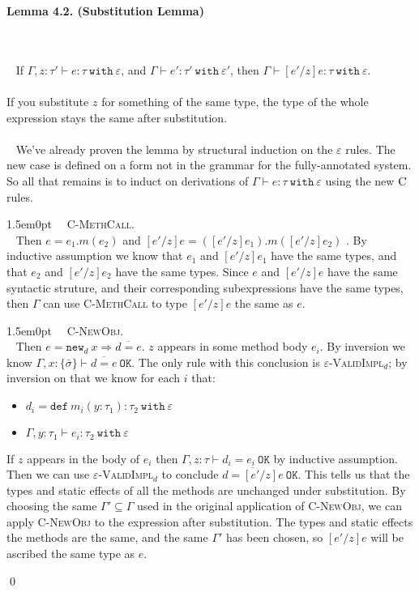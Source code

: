 \documentclass{llncs}
\newcommand{\keywadj}[1]{\mathtt{#1}}
\newcommand{\keyw}[1]{\keywadj{#1}~}
\newcommand{\thm}[3]{
	\begin{large}
		\bf{#1}
	\end{large} \\\\
	\fbox{Statement.} ~ #2
	\fbox{Proof.}~ #3 \qed
}
\newcommand{\proofcase}[2]{
	\begin{adjustwidth}{1.5em}{0pt}
		\fbox{Case.}~~#1. \\ ~#2
	\end{adjustwidth}
}
\newcommand{\type}[2]{
	#1~\keyw{with} #2
}
\newcommand{\newd}[0]{
	\keywadj{new}_d~x \Rightarrow \overline{d = e}
}
\begin{document}
\thm{Lemma 4.2. (Substitution Lemma)}
{If $\Gamma, z : \tau' \vdash e : \tau~\keyw{with} \varepsilon$, and $\Gamma \vdash e' : \tau'~\keyw{with} \varepsilon'$, then $\Gamma \vdash [e'/z]e : \tau~\keyw{with} \varepsilon$. \\\\
\fbox{Intuition} If you substitute $z$ for something of the same type, the type of the whole expression stays the same after substitution.
\\\\}
{We've already proven the lemma by structural induction on the $\varepsilon$ rules. The new case is defined on a form not in the grammar for the fully-annotated system. So all that remains is to induct on derivations of $\Gamma \vdash e : \type{\tau}{\varepsilon}$ using the new $\textsc{C}$ rules.\\

	\proofcase{\textsc{C-MethCall}}{
Then $e = e_1.m(e_2)$ and $[e'/z]e = ([e'/z]e_1).m([e'/z]e_2)$ . By inductive assumption we know that $e_1$ and $[e'/z]e_1$ have the same types, and that $e_2$ and $[e'/z]e_2$ have the same types. Since $e$ and $[e'/z]e$ have the same syntactic struture, and their corresponding subexpressions have the same types, then $\Gamma$ can use \textsc{C-MethCall} to type $[e'/z]e$ the same as $e$.\\
}

	\proofcase{\textsc{C-NewObj}}{
		Then $e = \newd$. $z$ appears in some method body $e_i$. By inversion we know $\Gamma, x : \{ \bar \sigma \} \vdash \overline {d = e}~\keywadj{OK}$. The only rule with this conclusion is \textsc{$\varepsilon$-ValidImpl$_d$}; by inversion on that we know for each $i$ that:
		 \begin{itemize}
		 	\item $d_i = \keyw{def} m_i(y : \tau_1) : \tau_2~\keyw{with} \varepsilon$
		 	\item $\Gamma, y : \tau_1 \vdash e_i : \tau_2~\keyw{with} \varepsilon$
		\end{itemize}

\noindent
If $z$ appears in the body of $e_i$ then $\Gamma, z : \tau \vdash d_i = e_i~\keywadj{OK}$ by inductive assumption. Then we can use \textsc{$\varepsilon$-ValidImpl$_d$} to conclude $\overline{d = [e'/z]e}~\keywadj{OK}$. This tells us that the types and static effects of all the methods are unchanged under substitution. By choosing the same $\Gamma' \subseteq \Gamma$ used in the original application of \textsc{C-NewObj}, we can apply \textsc{C-NewObj} to the expression after substitution. The types and static effects the methods are the same, and the same $\Gamma'$ has been chosen, so $[e'/z]e$ will be ascribed the same type as $e$.
}
}
\end{document}
